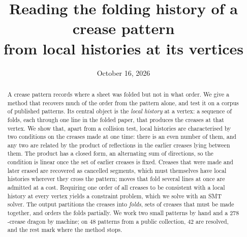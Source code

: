 \documentclass[11pt]{article}
\title{Reading the folding history of a crease pattern\\ from local histories at its vertices}
\author{}
\date{October 16, 2026}
\theoremstyle{definition}
\theoremstyle{remark}
\begin{document}
\maketitle

\begin{abstract}
A crease pattern records where a sheet was folded but not in what order. We give a method that recovers much of the order from the pattern alone, and test it on a corpus of published patterns. Its central object is the \emph{local history} at a vertex: a sequence of folds, each through one line in the folded paper, that produces the creases at that vertex. We show that, apart from a collision test, local histories are characterised by two conditions on the creases made at one time: there is an even number of them, and any two are related by the product of reflections in the earlier creases lying between them. The product has a closed form, an alternating sum of directions, so the condition is linear once the set of earlier creases is fixed. Creases that were made and later erased are recovered as cancelled segments, which must themselves have local histories wherever they cross the pattern; moves that fold several lines at once are admitted at a cost. Requiring one order of all creases to be consistent with a local history at every vertex yields a constraint problem, which we solve with an SMT solver. The output partitions the creases into \emph{folds}, sets of creases that must be made together, and orders the folds partially. We work two small patterns by hand and a $278$-crease dragon by machine; on $48$ patterns from a public collection, $42$ are resolved, and the rest mark where the method stops.
\end{abstract}
\end{document}
